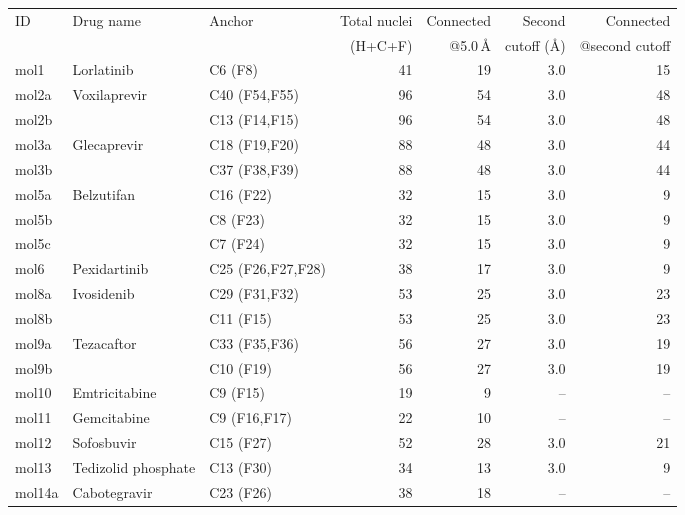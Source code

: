 \documentclass[11pt]{article}
\begin{document}
\small
\setlength{\tabcolsep}{3pt}
\begin{longtable}{@{}l l l r r r r@{}}
\toprule
ID & Drug name & Anchor & Total nuclei & Connected & Second & Connected \\
   &           &        & (H+C+F)      & @5.0\,\AA & cutoff (\AA) & @second cutoff \\
\midrule
\endhead
mol1     & Lorlatinib               & C6 (F8)                &  41 &  19 & 3.0  &  15 \\
mol2a    & Voxilaprevir             & C40 (F54,F55)          &  96 &  54 & 3.0  &  48 \\
mol2b    &                          & C13 (F14,F15)          &  96 &  54 & 3.0  &  48 \\
mol3a    & Glecaprevir              & C18 (F19,F20)          &  88 &  48 & 3.0  &  44 \\
mol3b    &                          & C37 (F38,F39)          &  88 &  48 & 3.0  &  44 \\
mol5a    & Belzutifan               & C16 (F22)              &  32 &  15 & 3.0  &   9 \\
mol5b    &                          & C8 (F23)               &  32 &  15 & 3.0  &   9 \\
mol5c    &                          & C7 (F24)               &  32 &  15 & 3.0  &   9 \\
mol6     & Pexidartinib             & C25 (F26,F27,F28)      &  38 &  17 & 3.0  &   9 \\
mol8a    & Ivosidenib               & C29 (F31,F32)          &  53 &  25 & 3.0  &  23 \\
mol8b    &                          & C11 (F15)              &  53 &  25 & 3.0  &  23 \\
mol9a    & Tezacaftor               & C33 (F35,F36)          &  56 &  27 & 3.0  &  19 \\
mol9b    &                          & C10 (F19)              &  56 &  27 & 3.0  &  19 \\
mol10    & Emtricitabine            & C9 (F15)               &  19 &   9 & --   &  -- \\
mol11    & Gemcitabine              & C9 (F16,F17)           &  22 &  10 & --   &  -- \\
mol12    & Sofosbuvir               & C15 (F27)              &  52 &  28 & 3.0  &  21 \\
mol13    & Tedizolid phosphate      & C13 (F30)              &  34 &  13 & 3.0  &   9 \\
mol14a   & Cabotegravir             & C23 (F26)              &  38 &  18 & --   &  -- \\

\end{longtable}
\end{document}
